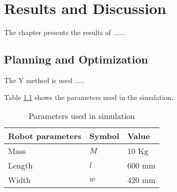 
\chapter{Results and Discussion} %

\label{Chapter5} %



The chapter presents the results of ......
  
\section{Planning and Optimization}\label{PlanResults}

The Y method is used ..... \citep{opencv_library}

Table \ref{tab:params} shows the parameters used in the simulation.
\begin{table}[!htb]
\caption{Parameters used in simulation}
\label{tab:params}
\begin{center}
\begin{tabular}{ |p{5cm}|p{2cm}|p{3cm}|  }
 \hline
 Robot parameters  &  Symbol & Value\\
 \hline
 Mass & $M$ & 10 Kg\\
 Length & $l$ & 600 mm\\
 Width & $w$ & 420 mm\\
 \hline
\end{tabular}
\end{center}
\end{table}
  

